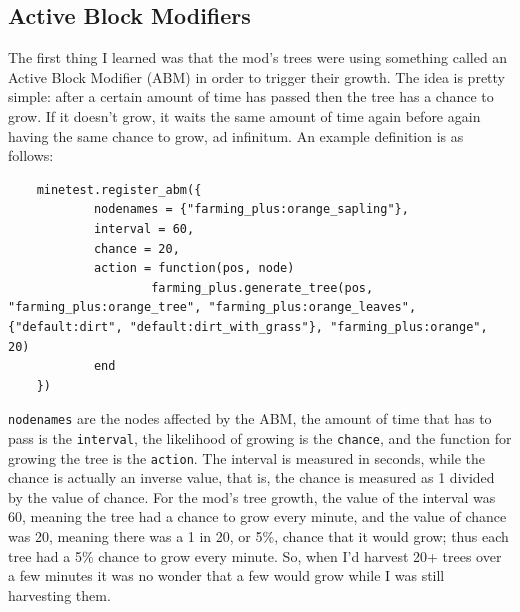 \documentclass{article}
\begin{document}
\subsection{Active Block Modifiers}
The first thing I learned was that the mod's trees were using something called an Active Block Modifier (ABM) in order to trigger their growth.  The idea is pretty simple: after a certain amount of time has passed then the tree has a chance to grow.  If it doesn't grow, it waits the same amount of time again before again having the same chance to grow, ad infinitum.  An example definition is as follows:
\begin{verbatim}
	minetest.register_abm({
	        nodenames = {"farming_plus:orange_sapling"},
	        interval = 60,
	        chance = 20,
	        action = function(pos, node)
	                farming_plus.generate_tree(pos, "farming_plus:orange_tree", "farming_plus:orange_leaves", {"default:dirt", "default:dirt_with_grass"}, "farming_plus:orange", 20)
	        end
	})
\end{verbatim}
\texttt{nodenames} are the nodes affected by the ABM, the amount of time that has to pass is the \texttt{interval}, the likelihood of growing is the \texttt{chance}, and the function for growing the tree is the \texttt{action}.  The interval is measured in seconds, while the chance is actually an inverse value, that is, the chance is measured as 1 divided by the value of chance.  For the mod's tree growth, the value of the interval was 60, meaning the tree had a chance to grow every minute, and the value of chance was 20, meaning there was a 1 in 20, or 5\%, chance that it would grow; thus each tree had a 5\% chance to grow every minute.  So, when I'd harvest 20+ trees over a few minutes it was no wonder that a few would grow while I was still harvesting them.
\end{document}
